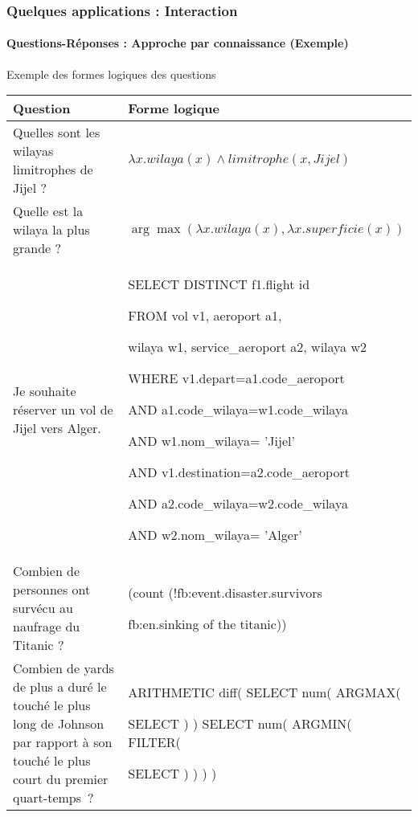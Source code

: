 \documentclass[xcolor=table]{beamer}
\begin{document}
\begin{frame}
	\frametitle{Quelques applications : Interaction}
	\framesubtitle{Questions-Réponses : Approche par connaissance (Exemple)}
	
	\begin{exampleblock}{Exemple des formes logiques des questions \cite{2020-jurafsky-martin}}
		\centering\tiny\bfseries
		\begin{tabular}{p{}p{}}
			\hline\hline
			Question & Forme logique \\
			\hline
			Quelles sont les wilayas limitrophes de Jijel ? & $\lambda x.wilaya(x) \wedge limitrophe(x, Jijel)$ \\
			
			Quelle est la wilaya la plus grande ? & $\arg\max(\lambda x.wilaya(x), \lambda x.superficie(x))$ \\
			
			Je souhaite réserver un vol de Jijel vers Alger. & {\color{blue}SELECT DISTINCT} f1.flight id
			
			{\color{blue}FROM} vol v1, aeroport  a1,
			
			wilaya w1, service\_aeroport a2, wilaya w2
			
			{\color{blue}WHERE} v1.depart=a1.code\_aeroport
			
			{\color{blue}AND} a1.code\_wilaya=w1.code\_wilaya
			
			{\color{blue}AND} w1.nom\_wilaya= '{\color{red}Jijel}'
			
			{\color{blue}AND} v1.destination=a2.code\_aeroport
			
			{\color{blue}AND} a2.code\_wilaya=w2.code\_wilaya
			
			{\color{blue}AND} w2.nom\_wilaya= '{\color{red}Alger}' \\
			
			
			Combien de personnes ont survécu au naufrage du Titanic ? & (count (!fb:event.disaster.survivors
			
			fb:en.sinking of the titanic))\\
			
			Combien de yards de plus a duré le touché le plus long de Johnson par rapport à son touché le plus court du premier quart-temps ? & 
			ARITHMETIC diff( SELECT num( ARGMAX(
			
			SELECT ) ) SELECT num( ARGMIN( FILTER(
			
			SELECT ) ) ) )\\
			\hline\hline
		\end{tabular}
	\end{exampleblock}
	
	
\end{frame}
\end{document}
